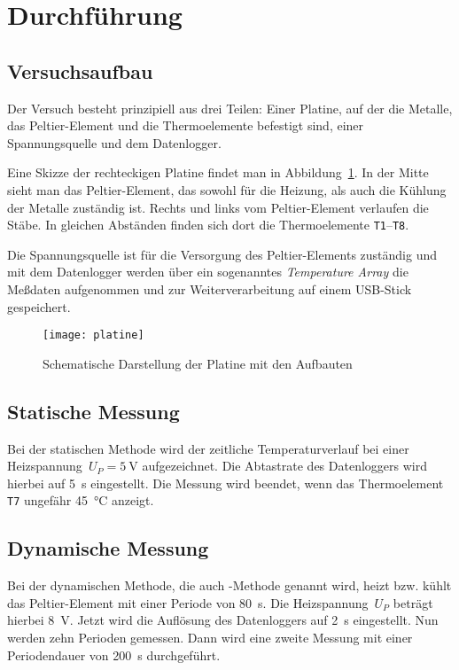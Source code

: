 
\section{Durchführung}

\subsection{Versuchsaufbau}

Der Versuch besteht prinzipiell aus drei Teilen: Einer Platine, auf der
die Metalle, das Peltier-Element und die Thermoelemente befestigt sind,
einer Spannungsquelle und dem Datenlogger.

Eine Skizze der rechteckigen Platine findet man in
Abbildung~\ref{fig:platine}. In der Mitte sieht man das Peltier-Element,
das sowohl für die Heizung, als auch die Kühlung der Metalle zuständig
ist. Rechts und links vom Peltier-Element verlaufen die Stäbe. In
gleichen Abständen finden sich dort die Thermoelemente
\texttt{T1}--\texttt{T8}.

Die Spannungsquelle ist für die Versorgung des Peltier-Elements
zuständig und mit dem Datenlogger werden über ein sogenanntes
\emph{Temperature Array} die Meßdaten aufgenommen und zur
Weiterverarbeitung auf einem USB-Stick gespeichert.

\begin{figure}
  \centering
  \texttt{[image: platine]}
  \caption{Schematische Darstellung der Platine mit den Aufbauten}
  \label{fig:platine}
\end{figure}

\subsection{Statische Messung}

Bei der statischen Methode wird der zeitliche Temperaturverlauf bei
einer Heizspannung~$U_P = \SI{5}{\volt}$ aufgezeichnet. Die Abtastrate
des Datenloggers wird hierbei auf \SI{5}{\second} eingestellt. Die
Messung wird beendet, wenn das Thermoelement \texttt{T7} ungefähr
\SI{45}{\degreeCelsius} anzeigt.

\subsection{Dynamische Messung}

Bei der dynamischen Methode, die auch -Methode genannt
wird, heizt bzw. kühlt das Peltier-Element mit einer Periode von
\SI{80}{s}. Die Heizspannung~$U_P$ beträgt hierbei \SI{8}{\volt}. Jetzt
wird die Auflösung des Datenloggers auf \SI{2}{\second} eingestellt. Nun
werden zehn Perioden gemessen. Dann wird eine zweite Messung mit einer
Periodendauer von \SI{200}{\second} durchgeführt.

